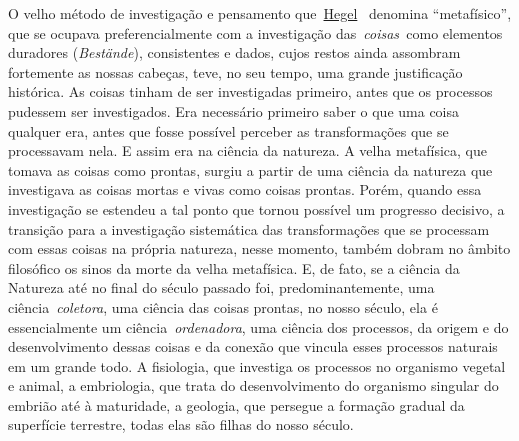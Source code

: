 O velho método de investigação e pensamento
que~\href{https://www.marxists.org/portugues/dicionario/verbetes/h/hegel.htm}{Hegel}~
denomina ``metafísico'', que se ocupava preferencialmente com a
investigação das~\emph{coisas~}como elementos duradores
(\emph{Bestände}), consistentes e dados, cujos restos ainda assombram
fortemente as nossas cabeças, teve, no seu tempo, uma grande
justificação histórica. As coisas tinham de ser investigadas primeiro,
antes que os processos pudessem ser investigados. Era necessário
primeiro saber o que uma coisa qualquer era, antes que fosse possível
perceber as transformações que se processavam nela. E assim era na
ciência da natureza. A velha metafísica, que tomava as coisas como
prontas, surgiu a partir de uma ciência da natureza que investigava as
coisas mortas e vivas como coisas prontas. Porém, quando essa
investigação se estendeu a tal ponto que tornou possível um progresso
decisivo, a transição para a investigação sistemática das transformações
que se processam com essas coisas na própria natureza, nesse momento,
também dobram no âmbito filosófico os sinos da morte da velha
metafísica. E, de fato, se a ciência da Natureza até no final do século
passado foi, predominantemente, uma ciência~\emph{coletora}, uma ciência
das coisas prontas, no nosso século, ela é essencialmente um
ciência~\emph{ordenadora}, uma ciência dos processos, da origem e do
desenvolvimento dessas coisas e da conexão que vincula esses processos
naturais em um grande todo. A fisiologia, que investiga os processos no
organismo vegetal e animal, a embriologia, que trata do desenvolvimento
do organismo singular do embrião até à maturidade, a geologia, que
persegue a formação gradual da superfície terrestre, todas elas são
filhas do nosso século.

